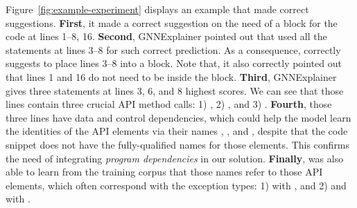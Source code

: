 

\vspace{2pt}
 Figure~\ref{fig:example-experiment} displays
an example that {\tool} made correct suggestions. {\bf First}, it made
a correct suggestion on the need of a  block for the
code at lines 1--8, 16.  {\bf Second}, GNNExplainer pointed out that
{\xblock} used all the statements at lines 3--8 for such correct
prediction. As a consequence, {\tool} correctly suggests to place
lines 3--8 into a  block. Note that, it also correctly
pointed out that lines 1 and 16 do not need to be inside the
 block.  {\bf Third}, GNNExplainer gives three
statements at lines 3, 6, and 8 highest scores. We can see that those
lines contain three crucial API method calls: 1)
, 2) , and 3) . {\bf
  Fourth}, those three lines have data and control dependencies, which
could help the model learn the identities of the API elements via
their names , , and ,
despite that the code snippet does not have the fully-qualified names
for those elements. This confirms the need of integrating {\em program
  dependencies} in our solution. {\bf Finally}, {\tool} was also able
to learn from the training corpus that those names refer to those API
elements, which often correspond with the exception types: 1)
 with , and 2)
 and  with
.



